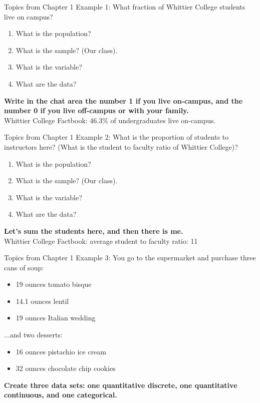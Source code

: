 \documentclass{beamer}
\begin{document}
\begin{frame}{Topics from Chapter 1}
Example 1: What fraction of Whittier College students live on campus?
\begin{enumerate}
\item What is the population?
\item What is the sample?  (Our class).
\item What is the variable?
\item What are the data?
\end{enumerate}
\textbf{Write in the chat area the number 1 if you live on-campus, and the number 0 if you live off-campus or with your family.} \\ \vspace{0.5cm}
Whittier College Factbook: 46.3\% of undergraduates live on-campus.
\end{frame}

\begin{frame}{Topics from Chapter 1}
Example 2: What is the proportion of students to instructors here?  (What is the student to faculty ratio of Whittier College)?
\begin{enumerate}
\item What is the population?
\item What is the sample?  (Our class).
\item What is the variable?
\item What are the data?
\end{enumerate}
\textbf{Let's sum the students here, and then there is me.} \\ \vspace{0.5cm}
Whittier College Factbook: average student to faculty ratio: 11
\end{frame}

\begin{frame}{Topics from Chapter 1}
\small
Example 3: You go to the supermarket and purchase three cans of soup:
\begin{itemize}
\item 19 ounces tomato bisque
\item 14.1 ounces lentil
\item 19 ounces Italian wedding
\end{itemize}
...and two desserts:
\begin{itemize}
\item 16 ounces pistachio ice cream
\item 32 ounces chocolate chip cookies
\end{itemize}
\textbf{Create three data sets: one quantitative discrete, one quantitative continuous, and one categorical.}
\end{frame}
\end{document}
